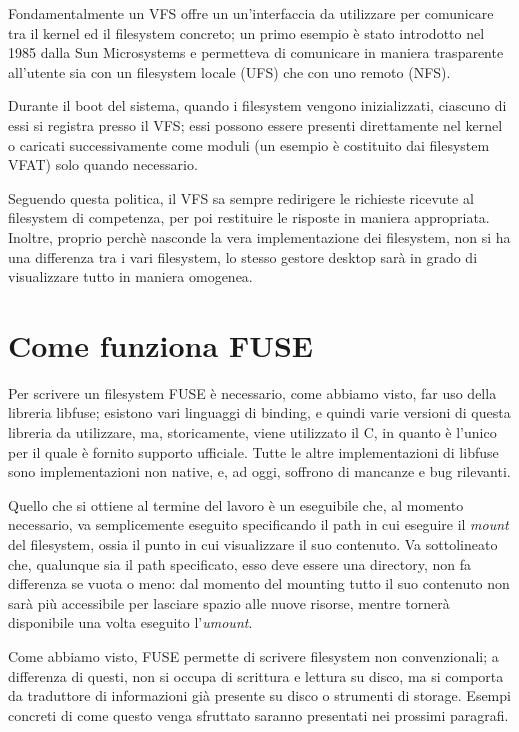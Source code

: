 Fondamentalmente un VFS offre un un'interfaccia da utilizzare per comunicare tra il kernel ed il filesystem concreto; un primo esempio è stato introdotto nel 1985 dalla Sun Microsystems e permetteva di comunicare in maniera trasparente all'utente sia con un filesystem locale (UFS) che con uno remoto (NFS).

Durante il boot del sistema, quando i filesystem vengono inizializzati, ciascuno di essi si registra presso il VFS; essi possono essere presenti direttamente nel kernel o caricati successivamente come moduli (un esempio è costituito dai filesystem VFAT) solo quando necessario. 

Seguendo questa politica, il VFS sa sempre redirigere le richieste ricevute al filesystem di competenza, per poi restituire le risposte in maniera appropriata. Inoltre, proprio perchè nasconde la vera implementazione dei filesystem, non si ha una differenza tra i vari filesystem, lo stesso gestore desktop sarà in grado di visualizzare tutto in maniera omogenea.

\section{Come funziona FUSE}
Per scrivere un filesystem FUSE è necessario, come abbiamo visto, far uso della libreria libfuse; esistono vari linguaggi di binding, e quindi varie versioni di questa libreria da utilizzare, ma, storicamente, viene utilizzato il C, in quanto è l'unico per il quale è fornito supporto ufficiale. Tutte le altre implementazioni di libfuse sono implementazioni non native, e, ad oggi, soffrono di mancanze e bug rilevanti.

Quello che si ottiene al termine del lavoro è un eseguibile che, al momento necessario, va semplicemente eseguito specificando il path in cui eseguire il \emph{mount} del filesystem, ossia il punto in cui visualizzare il suo contenuto. Va sottolineato che, qualunque sia il path specificato, esso deve essere una directory, non fa differenza se vuota o meno: dal momento del mounting tutto il suo contenuto non sarà più accessibile per lasciare spazio alle nuove risorse, mentre tornerà disponibile una volta eseguito l'\emph{umount}.

Come abbiamo visto, FUSE permette di scrivere filesystem non convenzionali; a differenza di questi, non si occupa di scrittura e lettura su disco, ma si comporta da traduttore di informazioni già presente su disco o strumenti di storage. Esempi concreti di come questo venga sfruttato saranno presentati nei prossimi paragrafi.

